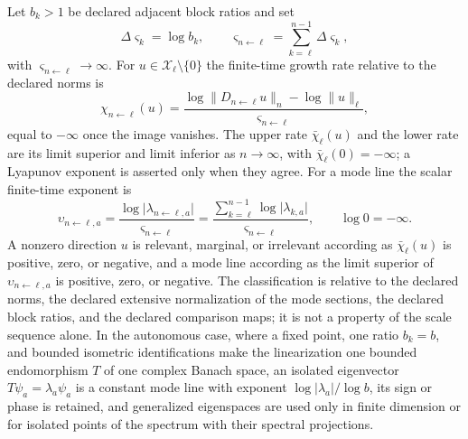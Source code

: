 \label{def:rg-action-relevance-conventions}
Let \(b_k>1\) be declared adjacent block ratios and set
\begin{equation}
\Delta\varsigma_k=\log b_k,
\qquad
\varsigma_{n\leftarrow\ell}=\sum_{k=\ell}^{n-1}\Delta\varsigma_k,
\label{eq:rg-cumulative-log-scale}
\end{equation}
with \(\varsigma_{n\leftarrow\ell}\to\infty\). For
\(u\in \mathscr X_\ell\setminus\{0\}\) the finite-time growth rate relative to the
declared norms is
\begin{equation}
\chi_{n\leftarrow\ell}(u)
=\frac{\log\lVert D_{n\leftarrow\ell}u\rVert_n-\log\lVert u\rVert_\ell}
{\varsigma_{n\leftarrow\ell}},
\label{eq:rg-finite-time-rate}
\end{equation}
equal to \(-\infty\) once the image vanishes. The upper rate
\(\bar\chi_\ell(u)\) and the lower rate are its limit superior and limit
inferior as \(n\to\infty\), with \(\bar\chi_\ell(0)=-\infty\); a Lyapunov
exponent is asserted only when they agree. For a mode line the scalar
finite-time exponent is
\begin{equation}
\upsilon_{n\leftarrow\ell,a}
=\frac{\log\lvert\lambda_{n\leftarrow\ell,a}\rvert}{\varsigma_{n\leftarrow\ell}}
=\frac{\sum_{k=\ell}^{n-1}\log\lvert\lambda_{k,a}\rvert}
{\varsigma_{n\leftarrow\ell}},
\qquad\log0=-\infty.
\label{eq:rg-scalar-exponent}
\end{equation}
A nonzero direction \(u\) is relevant, marginal, or irrelevant according as
\(\bar\chi_\ell(u)\) is positive, zero, or negative, and a mode line according
as the limit superior of \(\upsilon_{n\leftarrow\ell,a}\) is positive, zero, or
negative. The classification is relative to the declared norms, the declared
extensive normalization of the mode sections, the declared block ratios, and
the declared comparison maps; it is not a property of the scale sequence
alone. In the autonomous case, where a fixed point, one ratio \(b_k=b\), and
bounded isometric identifications make the linearization one bounded
endomorphism \(T\) of one complex Banach space, an isolated eigenvector
\(T\psi_a=\lambda_a\psi_a\) is a constant mode line with exponent
\(\log\lvert\lambda_a\rvert/\log b\), its sign or phase is retained, and
generalized eigenspaces are used only in finite dimension or for isolated
points of the spectrum with their spectral projections.

